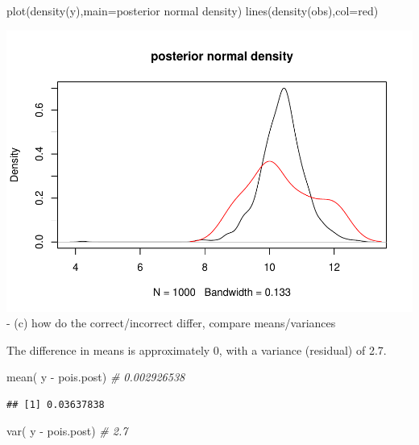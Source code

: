 \documentclass[
]{book}
\newenvironment{Shaded}{\begin{snugshade}}{\end{snugshade}}
\newcommand{\AttributeTok}[1]{\textcolor[rgb]{0.77,0.63,0.00}{#1}}
\newcommand{\CommentTok}[1]{\textcolor[rgb]{0.56,0.35,0.01}{\textit{#1}}}
\newcommand{\FunctionTok}[1]{\textcolor[rgb]{0.00,0.00,0.00}{#1}}
\newcommand{\NormalTok}[1]{#1}
\newcommand{\SpecialCharTok}[1]{\textcolor[rgb]{0.00,0.00,0.00}{#1}}
\newcommand{\StringTok}[1]{\textcolor[rgb]{0.31,0.60,0.02}{#1}}
\theoremstyle{definition}
\theoremstyle{definition}
\theoremstyle{definition}
\theoremstyle{definition}
\theoremstyle{remark}
\begin{document}
\begin{Shaded}
\begin{Highlighting}[]
  \FunctionTok{plot}\NormalTok{(}\FunctionTok{density}\NormalTok{(y),}\AttributeTok{main=}\StringTok{\textquotesingle{}posterior normal density\textquotesingle{}}\NormalTok{)}
  \FunctionTok{lines}\NormalTok{(}\FunctionTok{density}\NormalTok{(obs),}\AttributeTok{col=}\StringTok{\textquotesingle{}red\textquotesingle{}}\NormalTok{)}
\end{Highlighting}
\end{Shaded}

\includegraphics{_main_files/figure-latex/unnamed-chunk-40-2.pdf}
- (c) how do the correct/incorrect differ, compare means/variances

The difference in means is approximately 0, with a variance (residual) of 2.7.

\begin{Shaded}
\begin{Highlighting}[]
 \FunctionTok{mean}\NormalTok{( y }\SpecialCharTok{{-}}\NormalTok{ pois.post) }\CommentTok{\# 0.002926538}
\end{Highlighting}
\end{Shaded}

\begin{verbatim}
## [1] 0.03637838
\end{verbatim}

\begin{Shaded}
\begin{Highlighting}[]
 \FunctionTok{var}\NormalTok{( y }\SpecialCharTok{{-}}\NormalTok{ pois.post) }\CommentTok{\# 2.7}
\end{Highlighting}
\end{Shaded}
\end{document}
